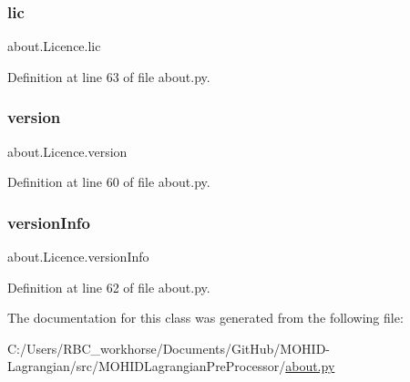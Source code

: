 \mbox{\label{classabout_1_1_licence_a4b8863c697fe25a9fec148269f98f10f}} 
\subsubsection{\texorpdfstring{lic}{lic}}
{\footnotesize\ttfamily about.\+Licence.\+lic}



Definition at line 63 of file about.\+py.

\mbox{\label{classabout_1_1_licence_a54d0ec766d3b53ff919f5e7349fe27c1}} 
\subsubsection{\texorpdfstring{version}{version}}
{\footnotesize\ttfamily about.\+Licence.\+version}



Definition at line 60 of file about.\+py.

\mbox{\label{classabout_1_1_licence_a1591338bb07744db00318cfb2279257b}} 
\subsubsection{\texorpdfstring{version\+Info}{versionInfo}}
{\footnotesize\ttfamily about.\+Licence.\+version\+Info}



Definition at line 62 of file about.\+py.



The documentation for this class was generated from the following file\+:\begin{DoxyCompactItemize}
\item 
C\+:/\+Users/\+R\+B\+C\+\_\+workhorse/\+Documents/\+Git\+Hub/\+M\+O\+H\+I\+D-\/\+Lagrangian/src/\+M\+O\+H\+I\+D\+Lagrangian\+Pre\+Processor/\mbox{\hyperlink{about_8py}{about.\+py}}\end{DoxyCompactItemize}
